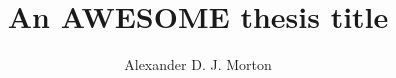 \documentclass[11pt,a4paper]{report}
\begin{document}
\title{
An AWESOME thesis title
}

\author{Alexander D. J. Morton}

\maketitle

\abstract{
%
}



\tableofcontents
\listoftables
\listoffigures



















%



 
\end{document}
